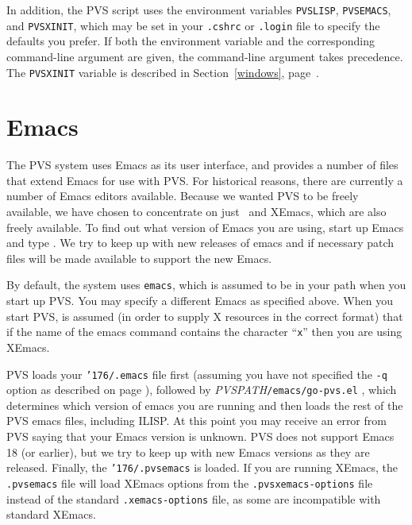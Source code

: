In addition, the PVS script uses the environment
variables
\texttt{PVSLISP},
\texttt{PVSEMACS}, and
\texttt{PVSXINIT}, which may be set in your
\texttt{.cshrc} or \texttt{.login} file to specify the defaults you
prefer.  If both the environment variable and the corresponding
command-line argument are given, the command-line argument takes
precedence.  The \texttt{PVSXINIT} variable is described in
Section~\ref{windows}, page~\pageref{windows}.


\section{Emacs}

The PVS system uses Emacs as its user interface, and provides a number of
files that extend Emacs for use with PVS.  For historical reasons, there
are currently a number of Emacs editors available.  Because we wanted PVS
to be freely available, we have chosen to concentrate on just \gnuemacs\
and XEmacs, which are also freely available.  To find out what version of
Emacs you are using, start up Emacs and type \iecmd{emacs-version}.  We
try to keep up with new releases of emacs and if necessary patch files
will be made available to support the new Emacs.

By default, the system uses \texttt{emacs}, which is assumed to be in your
path when you start up PVS.  You may specify a different Emacs as
specified above.  When you start PVS, is assumed (in order to supply X
resources in the correct format) that if the name of the emacs command
contains the character ``\texttt{x}'' then you are using XEmacs.

PVS loads your \texttt{\char'176/.emacs}
file first (assuming you have not specified the {\tt -q} option as
described on page \pageref{dash-q-option}), followed by
\emph{PVSPATH}\texttt{/emacs/go-pvs.el}%
, which determines which version of
emacs you are running and then loads the rest of the PVS emacs files,
including ILISP\index{ILISP}.  At this point you may receive an error from
PVS saying that your Emacs version is unknown.  PVS does not support Emacs
18 (or earlier), but we try to keep up with new Emacs versions as they are released.
Finally, the
\texttt{\char'176/.pvsemacs} is
loaded.  If you are running XEmacs, the {\tt .pvsemacs} file will load
XEmacs options from the {\tt .pvsxemacs-options} file instead of the
standard {\tt .xemacs-options} file, as some are incompatible with
standard XEmacs.


